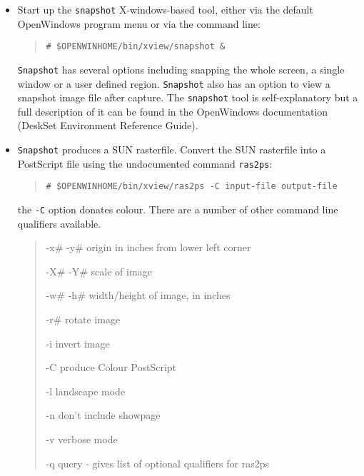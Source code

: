 \begin{itemize}

\item Start up the {\tt snapshot} X-windows-based tool, either via 
the default OpenWindows
program menu or via the command line:

\begin{quote}

{\tt \# \$OPENWINHOME/bin/xview/snapshot \&}

\end{quote}

{\tt Snapshot} has several options including snapping the whole screen, a
single window or a user defined region. {\tt Snapshot} also has an option to view a snapshot image file
after capture. The {\tt snapshot} tool is self-explanatory but a full
description of it can be found in the OpenWindows documentation (DeskSet
Environment Reference Guide).
    
\item {\tt Snapshot} produces a SUN
rasterfile. Convert the SUN rasterfile into a PostScript file using the 
undocumented command {\tt ras2ps}:
    
\begin{quote}

    {\tt \# \$OPENWINHOME/bin/xview/ras2ps -C input-file output-file}

\end{quote}
    
the {\tt -C} option donates colour. There are a number of other 
command line qualifiers available. 
    
\begin{quote}
{\tt 

-x\# -y\#   origin in inches from lower left corner

-X\# -Y\#   scale of image

-w\# -h\#   width/height of image, in inches

-r\#       rotate image

-i        invert image

-C        produce Colour PostScript

-l        landscape mode

-n        don't include showpage

-v        verbose mode

-q        query - gives list of optional qualifiers for ras2ps

}
\end{quote}


\end{itemize}

